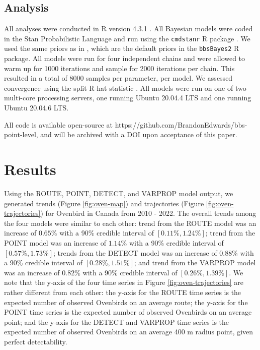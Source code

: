 \documentclass[12pt]{article}
\begin{document}
\subsection{Analysis}
\par All analyses were conducted in R version 4.3.1 \citep{r_core_team_r_2024}.
All Bayesian models were coded in the Stan Probabilistic Language \citep{stan_development_team_stan_2024} and run using the \texttt{cmdstanr} R package \citep{gabry_cmdstanr_2023}.
We used the same priors as in \citet{smith_spatially_2023}, which are the default priors in the \texttt{bbsBayes2} R package.
All models were run for four independent chains and were allowed to warm up for 1000 iterations and sample for 2000 iterations per chain.
This resulted in a total of 8000 samples per parameter, per model.
We assessed convergence using the split R-hat statistic \citep{vehtari_rank-normalization_2021}.
All models were run on one of two multi-core processing servers, one running Ubuntu 20.04.4 LTS and one running Ubuntu 20.04.6 LTS.

\par All code is available open-source at https://github.com/BrandonEdwards/bbs-point-level, and will be archived with a DOI upon acceptance of this paper.

\section{Results}

\par Using the ROUTE, POINT, DETECT, and VARPROP model output, we generated trends (Figure \ref{fig:oven-map}) and trajectories (Figure \ref{fig:oven-trajectories}) for Ovenbird in Canada from 2010 - 2022.
The overall trends among the four models were similar to each other: trend from the ROUTE model was an increase of $0.65\%$ with a 90\% credible interval of $[0.11\%, 1.24\%]$; trend from the POINT model was an increase of $1.14\%$ with a 90\% credible interval of $[0.57\%, 1.73\%]$; trends from the DETECT model was an increase of $0.88\%$ with a 90\% credible interval of $[0.28\%, 1.51\%]$; and trend from the VARPROP model was an increase of $0.82\%$ with a 90\% credible interval of $[0.26\%, 1.39\%]$.
We note that the y-axis of the four time series in Figure \ref{fig:oven-trajectories} are rather different from each other: the y-axis for the ROUTE time series is the expected number of observed Ovenbirds on an average route; the y-axis for the POINT time series is the expected number of observed Ovenbirds on an average point; and the y-axis for the DETECT and VARPROP time series is the expected number of observed Ovenbirds on an average 400 m radius point, given perfect detectability.
\end{document}
